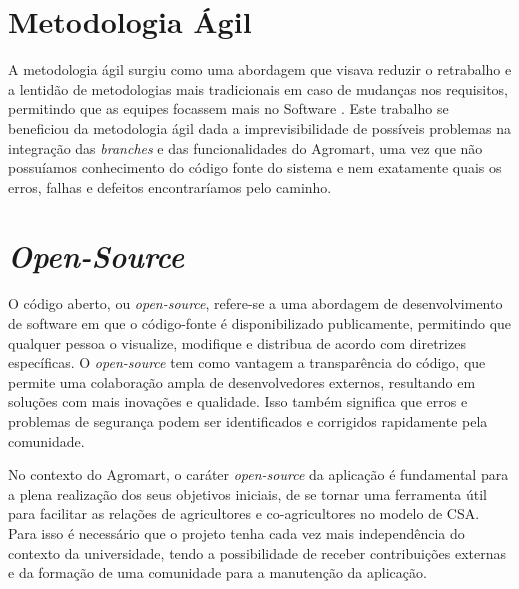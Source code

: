 \section{Metodologia Ágil}
A metodologia ágil surgiu como uma abordagem que visava reduzir o retrabalho e a lentidão de metodologias mais tradicionais em caso de mudanças nos requisitos, permitindo que as equipes focassem mais no Software \cite{Sommerville2007}.
Este trabalho se beneficiou da metodologia ágil dada a imprevisibilidade de possíveis problemas na integração das \textit{branches} e das funcionalidades do Agromart, uma vez que não possuíamos conhecimento do código fonte do sistema e nem exatamente quais os erros, falhas e defeitos encontraríamos pelo caminho.

\section{\textit{Open-Source}}
O código aberto, ou \textit{open-source}, refere-se a uma abordagem de desenvolvimento de software em que o código-fonte é disponibilizado publicamente, permitindo que qualquer pessoa o visualize, modifique e distribua de acordo com diretrizes específicas.\cite{opensource2023} O \textit{open-source} tem como vantagem a transparência do código, que permite uma colaboração ampla de desenvolvedores externos, resultando em soluções com mais inovações e qualidade. Isso também significa que erros e problemas de segurança podem ser identificados e corrigidos rapidamente pela comunidade. 

No contexto do Agromart, o caráter \textit{open-source} da aplicação é fundamental para a plena realização dos seus objetivos iniciais, de se tornar uma ferramenta útil para facilitar as relações de agricultores e co-agricultores no modelo de CSA. Para isso é necessário que o projeto tenha cada vez mais independência do contexto da universidade, tendo a possibilidade de receber contribuições externas e da formação de uma comunidade para a manutenção da aplicação.